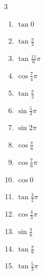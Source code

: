 \begin{multicols}{3}
\begin{enumerate}
\columnbreak %

  \item $\displaystyle \tan{0}$
        \phantom{$\displaystyle =0$}

  \item $\displaystyle \tan{\frac{\pi}{3}}$

  \item $\displaystyle \tan{\frac{11}{6}\pi}$

  \item $\displaystyle \cos{\frac{7}{4}\pi}$

  \item $\displaystyle \tan{\frac{\pi}{2}}$
        \phantom{$\displaystyle \quad なし$}

  \item $\displaystyle \sin{\frac{5}{3}\pi}$

  \item $\displaystyle \sin{2\pi}$
        \phantom{$\displaystyle =0$}

  \item $\displaystyle \cos{\frac{\pi}{6}}$

  \item $\displaystyle \cos{\frac{7}{6}\pi}$

  \item $\displaystyle \cos{0}$
        \phantom{$\displaystyle =1$}

  \item $\displaystyle \tan{\frac{3}{2}\pi}$
        \phantom{$\displaystyle \quad なし$}

  \item $\displaystyle \cos{\frac{4}{3}\pi}$

  \item $\displaystyle \sin{\frac{\pi}{6}}$

  \item $\displaystyle \tan{\frac{\pi}{6}}$

  \item $\displaystyle \tan{\frac{5}{3}\pi}$


\end{enumerate}
\end{multicols}
